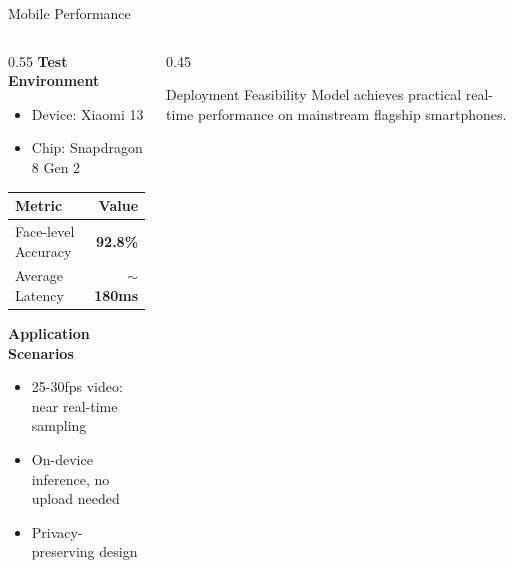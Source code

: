 \documentclass[aspectratio=169,12pt]{beamer}
\newcommand{\highlight}[1]{\textcolor{primaryblue}{\textbf{#1}}}
\begin{document}
\begin{frame}{Mobile Performance}
\begin{columns}[T]
\begin{column}{0.55\textwidth}
\textbf{Test Environment}
\begin{itemize}
    \item Device: Xiaomi 13
    \item Chip: Snapdragon 8 Gen 2
\end{itemize}

\vspace{0.5em}
\begin{center}
\begin{tabular}{lr}
\toprule
\textbf{Metric} & \textbf{Value} \\
\midrule
Face-level Accuracy & \highlight{92.8\%} \\
Average Latency & \highlight{$\sim$180ms} \\
\bottomrule
\end{tabular}
\end{center}

\vspace{0.5em}
\textbf{Application Scenarios}
\begin{itemize}
    \item 25-30fps video: near real-time sampling
    \item On-device inference, no upload needed
    \item Privacy-preserving design
\end{itemize}
\end{column}

\begin{column}{0.45\textwidth}
\begin{block}{Deployment Feasibility}
Model achieves practical real-time performance on mainstream flagship smartphones.
\end{block}

\vspace{1em}
\end{column}
\end{columns}
\end{frame}
\end{document}
